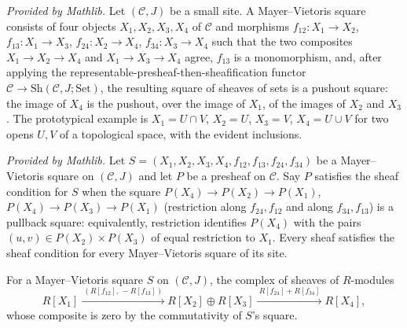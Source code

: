 \begin{definition}
  \label{def:MayerVietorisSquare}
  \mathlibok
  \textit{Provided by Mathlib.}
  Let \((\mathcal C, J)\) be a small site. A Mayer--Vietoris square consists of four objects
  \(X_1, X_2, X_3, X_4\) of \(\mathcal C\) and morphisms \(f_{12} : X_1 \to X_2\),
  \(f_{13} : X_1 \to X_3\), \(f_{24} : X_2 \to X_4\), \(f_{34} : X_3 \to X_4\) such that the
  two composites \(X_1 \to X_2 \to X_4\) and \(X_1 \to X_3 \to X_4\) agree, \(f_{13}\) is a
  monomorphism, and, after applying the representable-presheaf-then-sheafification functor
  \(\mathcal C \to \mathrm{Sh}(\mathcal C, J; \mathrm{Set})\), the resulting square of
  sheaves of sets is a pushout square: the image of \(X_4\) is the pushout, over the image of
  \(X_1\), of the images of \(X_2\) and \(X_3\). The prototypical example is
  \(X_1 = U \cap V\), \(X_2 = U\), \(X_3 = V\), \(X_4 = U \cup V\) for two opens \(U, V\) of a
  topological space, with the evident inclusions.
\end{definition}

\begin{definition}
  \label{def:mv_sheaf_condition}
  \mathlibok
  \textit{Provided by Mathlib.}
  Let \(S = (X_1,X_2,X_3,X_4,f_{12},f_{13},f_{24},f_{34})\) be a Mayer--Vietoris square on
  \((\mathcal C, J)\) and let \(P\) be a presheaf on \(\mathcal C\). Say \(P\) satisfies the
  sheaf condition for \(S\) when the square \(P(X_4) \to P(X_2) \to P(X_1)\),
  \(P(X_4) \to P(X_3) \to P(X_1)\) (restriction along \(f_{24}, f_{12}\) and along
  \(f_{34}, f_{13}\)) is a pullback square: equivalently, restriction identifies \(P(X_4)\)
  with the pairs \((u,v) \in P(X_2) \times P(X_3)\) of equal restriction to \(X_1\). Every
  sheaf satisfies the sheaf condition for every Mayer--Vietoris square of its site.
\end{definition}

\begin{definition}
  \label{def:moduleShortComplex}
  \leanok
  For a Mayer--Vietoris square \(S\) on \((\mathcal C, J)\), the complex of sheaves of
  \(R\)-modules
  \[
    R[X_1] \xrightarrow{\ (R[f_{12}],\, -R[f_{13}])\ } R[X_2] \oplus R[X_3]
      \xrightarrow{\ R[f_{24}] + R[f_{34}]\ } R[X_4],
  \]
  whose composite is zero by the commutativity of \(S\)'s square.
\end{definition}

